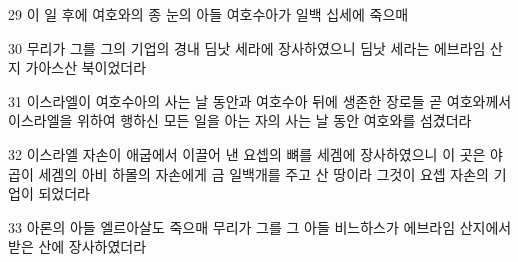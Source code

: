\par 29 이 일 후에 여호와의 종 눈의 아들 여호수아가 일백 십세에 죽으매
\par 30 무리가 그를 그의 기업의 경내 딤낫 세라에 장사하였으니 딤낫 세라는 에브라임 산지 가아스산 북이었더라
\par 31 이스라엘이 여호수아의 사는 날 동안과 여호수아 뒤에 생존한 장로들 곧 여호와께서 이스라엘을 위하여 행하신 모든 일을 아는 자의 사는 날 동안 여호와를 섬겼더라
\par 32 이스라엘 자손이 애굽에서 이끌어 낸 요셉의 뼈를 세겜에 장사하였으니 이 곳은 야곱이 세겜의 아비 하몰의 자손에게 금 일백개를 주고 산 땅이라 그것이 요셉 자손의 기업이 되었더라
\par 33 아론의 아들 엘르아살도 죽으매 무리가 그를 그 아들 비느하스가 에브라임 산지에서 받은 산에 장사하였더라


